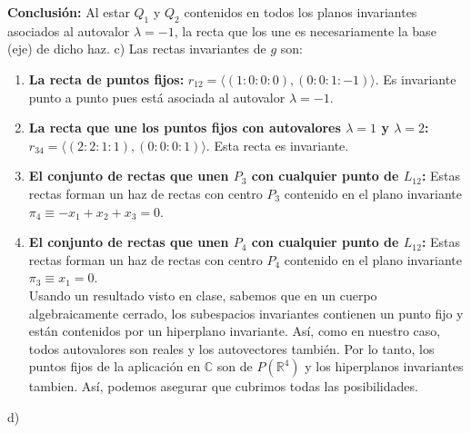 {\textbf{Conclusión:} Al estar $Q_1$ y $Q_2$ contenidos en todos los planos invariantes asociados al autovalor $\lambda = -1$, la recta que los une es necesariamente la base (eje) de dicho haz.
c)
Las rectas invariantes de $g$ son:

\begin{enumerate}
    \item \textbf{La recta de puntos fijos:} 
    $r_{12} = \langle (1:0:0:0), (0:0:1:-1) \rangle$. Es invariante punto a punto pues está asociada al autovalor $\lambda = -1$.
    
    \item \textbf{La recta que une los puntos fijos con autovalores $\lambda=1$ y $\lambda=2$:}
    $r_{34} = \langle (2:2:1:1), (0:0:0:1) \rangle$. Esta recta es invariante.
    
    \item \textbf{El conjunto de rectas que unen $P_3$ con cualquier punto de $L_{12}$:}
    Estas rectas forman un haz de rectas con centro $P_3$ contenido en el plano invariante $\pi_4 \equiv -x_1 + x_2 + x_3 = 0$.
    
    \item \textbf{El conjunto de rectas que unen $P_4$ con cualquier punto de $L_{12}$:}
    Estas rectas forman un haz de rectas con centro $P_4$ contenido en el plano invariante $\pi_3 \equiv x_1 = 0$.
    \\
    Usando un resultado visto en clase, sabemos que en un cuerpo algebraicamente cerrado, los subespacios invariantes contienen un punto fijo y están contenidos por un hiperplano invariante. Así, como en nuestro caso, todos autovalores son reales y los autovectores también. Por lo tanto, los puntos fijos de la aplicación en $\mathbb{C}$   son de $P(\mathbb{R}^4)$  y los hiperplanos invariantes tambien. Así, podemos asegurar que cubrimos todas las posibilidades.
\end{enumerate}
d)

}
